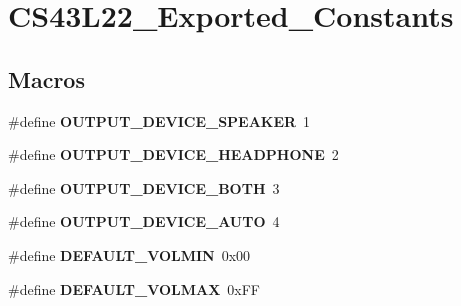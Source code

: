 \hypertarget{group___c_s43_l22___exported___constants}{}\section{C\+S43\+L22\+\_\+\+Exported\+\_\+\+Constants}
\label{group___c_s43_l22___exported___constants}
\subsection*{Macros}
\begin{DoxyCompactItemize}
\item 
\mbox{\label{group___c_s43_l22___exported___constants_ga7c4a34b8ce724d628e0cbc39dcdfb2d3}} 
\#define {\bfseries O\+U\+T\+P\+U\+T\+\_\+\+D\+E\+V\+I\+C\+E\+\_\+\+S\+P\+E\+A\+K\+ER}~1
\item 
\mbox{\label{group___c_s43_l22___exported___constants_gad6f7ad04576e024dc78963f155980781}} 
\#define {\bfseries O\+U\+T\+P\+U\+T\+\_\+\+D\+E\+V\+I\+C\+E\+\_\+\+H\+E\+A\+D\+P\+H\+O\+NE}~2
\item 
\mbox{\label{group___c_s43_l22___exported___constants_gae2a20594d7d7356ac9315f37f0ed62f0}} 
\#define {\bfseries O\+U\+T\+P\+U\+T\+\_\+\+D\+E\+V\+I\+C\+E\+\_\+\+B\+O\+TH}~3
\item 
\mbox{\label{group___c_s43_l22___exported___constants_gaf6f0fbe98257f2035bdbfeacc79a10b3}} 
\#define {\bfseries O\+U\+T\+P\+U\+T\+\_\+\+D\+E\+V\+I\+C\+E\+\_\+\+A\+U\+TO}~4
\item 
\mbox{\label{group___c_s43_l22___exported___constants_gaf14c1f3e9bcde6a376d20cef1b3c03e0}} 
\#define {\bfseries D\+E\+F\+A\+U\+L\+T\+\_\+\+V\+O\+L\+M\+IN}~0x00
\item 
\mbox{\label{group___c_s43_l22___exported___constants_gac2db63dec7008b6c7cf8e836bdd2718a}} 
\#define {\bfseries D\+E\+F\+A\+U\+L\+T\+\_\+\+V\+O\+L\+M\+AX}~0x\+FF
\item 
\mbox{\label{group___c_s43_l22___exported___constants_gaef8d4a7654c408aaa3f81becc62c3918}} 

\end{DoxyCompactItemize}
